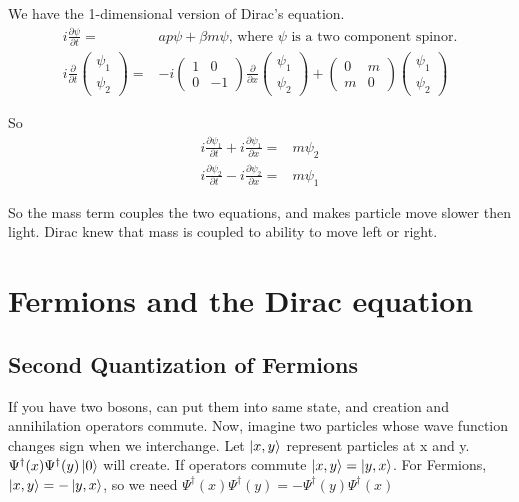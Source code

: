 \documentclass[]{article}
\begin{document}
We have the 1-dimensional version of Dirac's equation.
\begin{align*}
	i \frac{\partial \psi}{\partial t}=& a p \psi + \beta m \psi \text{, where $\psi$ is a two component spinor.}\\
	i \frac{\partial}{\partial t}\begin{pmatrix}
	\psi_1\\
	\psi_2
	\end{pmatrix}=&-i \begin{pmatrix}
	1&0\\
	0&-1
	\end{pmatrix} \frac{\partial}{\partial x}\begin{pmatrix}
	\psi_1\\
	\psi_2
	\end{pmatrix} + \begin{pmatrix}
	0&m\\
	m&0
	\end{pmatrix}\begin{pmatrix}
	\psi_1\\
	\psi_2
	\end{pmatrix}
\end{align*}

So
\begin{align*}
i\frac{\partial \psi_1}{\partial t} + i\frac{\partial \psi_1}{\partial x}=&m \psi_2\\
i\frac{\partial \psi_2}{\partial t} - i\frac{\partial \psi_2}{\partial x}=&m \psi_1
\end{align*}

So the mass term couples the two equations, and makes particle move slower then light. Dirac knew that mass is coupled to ability to move left or right.

\section{Fermions and the Dirac equation}

\subsection{Second Quantization of Fermions}

If you have two bosons, can put them into same state, and creation and annihilation operators commute. Now, imagine two particles whose wave function changes sign when we interchange. Let $\ket{x,y}$ represent particles at x and y. $\Psi^\dagger(x)\Psi^\dagger(y)\ket{0}$ will create. If operators commute $\ket{x,y}=\ket{y,x}$. For Fermions, $\ket{x,y}=-\ket{y,x}$, so we need  $\Psi^\dagger(x)\Psi^\dagger(y)= -\Psi^\dagger(y)\Psi^\dagger(x)$
 
\end{document}

